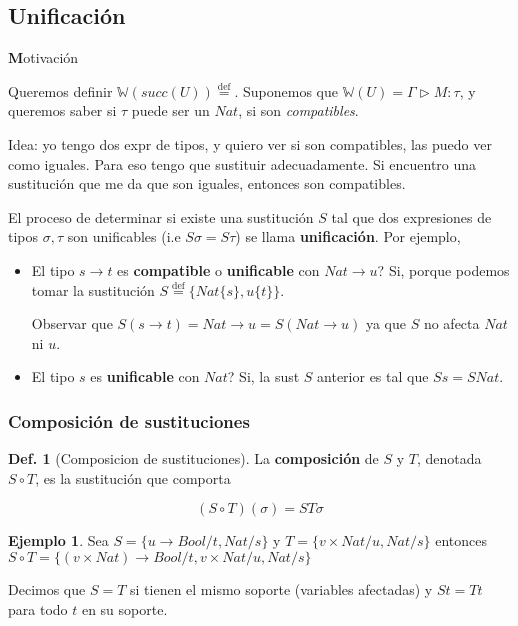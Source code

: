 \documentclass{report}
\theoremstyle{definition} %
\newtheorem{definition}{Def.}[chapter]
\newtheorem{example}{Ejemplo}[chapter]
\newenvironment{nota}[1]
    {\begin{leftbar}\textbf{#1}}
    {\end{leftbar}}
\newcommand{\eqdef}{\overset{\text{def}}{=}}
\newcommand{\tfunc}[2]{#1 \to #2}
\newcommand{\sust}[2]{#1 \{ #2 \}}
\newcommand{\tipa}[3]{#1 \rhd #2 : #3} %
\newcommand{\Gtipa}[2]{\tipa{\Gamma}{#1}{#2}}
\newcommand{\suc}[1]{succ(#1)}
\newcommand{\tsust}[1]{S#1} %
\newcommand{\sustfor}[2]{#1/#2} %
\newcommand{\infer}[1]{\mathbb{W}(#1)}
\newcommand{\comp}[2]{#1 \circ #2}
\begin{document}
\subsection{Unificación}

\begin{nota}
    Motivación

    Queremos definir $\infer{\suc{U}} \eqdef$. Suponemos que $\infer{U} =
    \Gtipa{M}{\tau}$, y queremos saber si $\tau$ puede ser un $Nat$, si son
    \textit{compatibles}.
    
    Idea: yo tengo dos expr de tipos, y quiero ver si son compatibles, las puedo
    ver como iguales. Para eso tengo que sustituir adecuadamente. Si encuentro
    una sustitución que me da que son iguales, entonces son compatibles.
\end{nota}

El proceso de determinar si existe una sustitución $S$ tal que dos expresiones
de tipos $\sigma, \tau$ son unificables (i.e $\tsust{\sigma} =
\tsust{\tau}$) se llama \textbf{unificación}. Por ejemplo,

\begin{itemize}
    \item El tipo $\tfunc{s}{t}$ es \textbf{compatible} o \textbf{unificable}
    con $\tfunc{Nat}{u}$? Si, porque podemos tomar la sustitución $S \eqdef \{
    \sust{Nat}{s}, \sust{u}{t} \}$.

    Observar que
    \(
        \tsust{(\tfunc{s}{t})}
        = \tfunc{Nat}{u}
        = \tsust{(\tfunc{Nat}{u})}
    \)
    ya que $S$ no afecta $Nat$ ni $u$.

    \item El tipo $s$ es \textbf{unificable} con $Nat$? Si, la sust $S$ anterior
    es tal que $\tsust{s} = \tsust{Nat}$.
\end{itemize}

\subsubsection{Composición de sustituciones}

\begin{definition}[Composicion de sustituciones]
    La \textbf{composición} de $S$ y $T$, denotada $\comp{S}{T}$, es la sustitución que
    comporta

    \[
        (\comp{S}{T})(\sigma) = \tsust{T \sigma}
    \]

    \begin{example}
        Sea $S = \{ \sustfor{\tfunc{u}{Bool}}{t}, \sustfor{Nat}{s} \}$ y $T = \{
        \sustfor{v \times Nat}{u}, \sustfor{Nat}{s} \}$ entonces $\comp{S}{T} =
        \{ \sustfor{\tfunc{(v \times Nat)}{Bool}}{t}, \sustfor{v \times Nat}{u},
            \sustfor{Nat}{s}
        \}$
    \end{example}

    Decimos que $S = T$ si tienen el mismo soporte (variables afectadas) y $St =
    Tt$ para todo $t$ en su soporte.
\end{definition}
\end{document}
